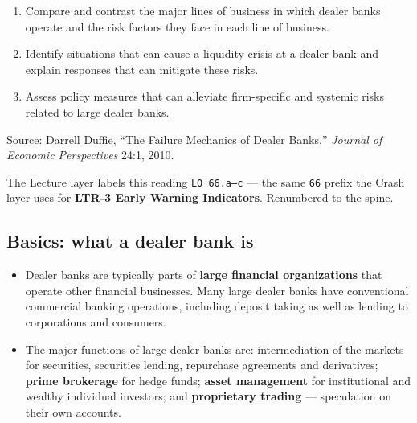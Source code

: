 
\begin{lrkeybox}
\begin{enumerate}[label=\textbf{\alph*.}]
\item Compare and contrast the major lines of business in which dealer banks operate and the risk factors they face in each line of business.
\item Identify situations that can cause a liquidity crisis at a dealer bank and explain responses that can mitigate these risks.
\item Assess policy measures that can alleviate firm-specific and systemic risks related to large dealer banks.
\end{enumerate}
{\footnotesize\color{FRMGrey}Source: Darrell Duffie, ``The Failure Mechanics of Dealer Banks,'' \textit{Journal of Economic Perspectives} 24:1, 2010.}
\end{lrkeybox}

\begin{lrtrapbox}
The Lecture layer labels this reading \texttt{LO 66.a--c} --- the same \texttt{66} prefix the Crash layer uses for \textbf{LTR-3 Early Warning Indicators}. Renumbered to the spine.
\end{lrtrapbox}

\subsection*{Basics: what a dealer bank is}

\begin{itemize}
\item Dealer banks are typically parts of \textbf{large financial organizations} that operate other financial businesses. Many large dealer banks have conventional commercial banking operations, including deposit taking as well as lending to corporations and consumers.
\item The major functions of large dealer banks are: intermediation of the markets for securities, securities lending, repurchase agreements and derivatives; \textbf{prime brokerage} for hedge funds; \textbf{asset management} for institutional and wealthy individual investors; and \textbf{proprietary trading} --- speculation on their own accounts.
\end{itemize}


